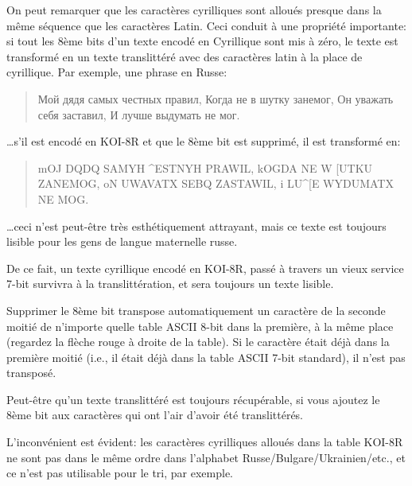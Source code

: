 On peut remarquer que les caractères cyrilliques sont alloués presque dans la même
séquence que les caractères Latin.
Ceci conduit à une propriété importante: si tout les 8ème bits d'un texte encodé en
Cyrillique sont mis à zéro, le texte est transformé en un texte translittéré avec
des caractères latin à la place de cyrillique.
Par exemple, une phrase en Russe:

\begin{framed}
\begin{quotation}
Мой дядя самых честных правил, Когда не в шутку занемог, Он уважать себя заставил, И лучше выдумать не мог.
\end{quotation}
\end{framed}

\dots s'il est encodé en KOI-8R et que le 8ème bit est supprimé, il est transformé en:

\begin{framed}
\begin{quotation}
mOJ DQDQ SAMYH \^{}ESTNYH PRAWIL, kOGDA NE W [UTKU ZANEMOG, oN UWAVATX SEBQ ZASTAWIL, i LU\^{}[E WYDUMATX NE MOG.
\end{quotation}
\end{framed}

\dots ceci n'est peut-être très esthétiquement attrayant, mais ce texte est toujours
lisible pour les gens de langue maternelle russe.

De ce fait, un texte cyrillique encodé en KOI-8R, passé à travers un vieux service 7-bit
survivra à la translittération, et sera toujours un texte lisible.

Supprimer le 8ème bit transpose automatiquement un caractère de la seconde moitié
de n'importe quelle table \ac{ASCII} 8-bit dans la première, à la même place (regardez
la flèche rouge à droite de la table).
Si le caractère était déjà dans la première moitié (i.e., il était déjà dans la table
\ac{ASCII} 7-bit standard), il n'est pas transposé.

Peut-être qu'un texte translittéré est toujours récupérable, si vous ajoutez le
8ème bit aux caractères qui ont l'air d'avoir été translittérés.

L'inconvénient est évident: les caractères cyrilliques alloués dans la table KOI-8R
ne sont pas dans le même ordre dans l'alphabet Russe/Bulgare/Ukrainien/etc., et ce
n'est pas utilisable pour le tri, par exemple.
